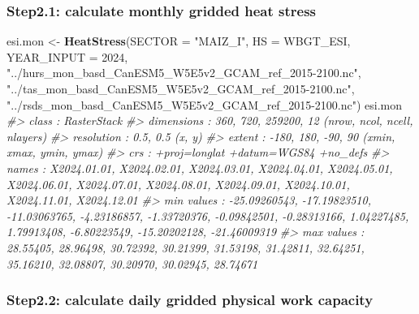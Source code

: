 \documentclass[
]{article}
\newenvironment{Shaded}{\begin{snugshade}}{\end{snugshade}}
\newcommand{\AttributeTok}[1]{\textcolor[rgb]{0.13,0.29,0.53}{#1}}
\newcommand{\CommentTok}[1]{\textcolor[rgb]{0.56,0.35,0.01}{\textit{#1}}}
\newcommand{\DecValTok}[1]{\textcolor[rgb]{0.00,0.00,0.81}{#1}}
\newcommand{\FunctionTok}[1]{\textcolor[rgb]{0.13,0.29,0.53}{\textbf{#1}}}
\newcommand{\NormalTok}[1]{#1}
\newcommand{\OtherTok}[1]{\textcolor[rgb]{0.56,0.35,0.01}{#1}}
\newcommand{\StringTok}[1]{\textcolor[rgb]{0.31,0.60,0.02}{#1}}
\begin{document}
\subsubsection{Step2.1: calculate monthly gridded heat
stress}\label{step2.1-calculate-monthly-gridded-heat-stress}

\begin{Shaded}
\begin{Highlighting}[]
\NormalTok{esi.mon }\OtherTok{\textless{}{-}} \FunctionTok{HeatStress}\NormalTok{(}\AttributeTok{SECTOR =} \StringTok{"MAIZ\_I"}\NormalTok{, }\AttributeTok{HS =}\NormalTok{ WBGT\_ESI, }\AttributeTok{YEAR\_INPUT =} \DecValTok{2024}\NormalTok{,}
                    \StringTok{"../hurs\_mon\_basd\_CanESM5\_W5E5v2\_GCAM\_ref\_2015{-}2100.nc"}\NormalTok{,}
                    \StringTok{"../tas\_mon\_basd\_CanESM5\_W5E5v2\_GCAM\_ref\_2015{-}2100.nc"}\NormalTok{,}
                    \StringTok{"../rsds\_mon\_basd\_CanESM5\_W5E5v2\_GCAM\_ref\_2015{-}2100.nc"}\NormalTok{)}
\NormalTok{esi.mon}
\CommentTok{\#\textgreater{} class      : RasterStack }
\CommentTok{\#\textgreater{} dimensions : 360, 720, 259200, 12  (nrow, ncol, ncell, nlayers)}
\CommentTok{\#\textgreater{} resolution : 0.5, 0.5  (x, y)}
\CommentTok{\#\textgreater{} extent     : {-}180, 180, {-}90, 90  (xmin, xmax, ymin, ymax)}
\CommentTok{\#\textgreater{} crs        : +proj=longlat +datum=WGS84 +no\_defs }
\CommentTok{\#\textgreater{} names      :  X2024.01.01,  X2024.02.01,  X2024.03.01,  X2024.04.01,  X2024.05.01,  X2024.06.01,  X2024.07.01,  X2024.08.01,  X2024.09.01,  X2024.10.01,  X2024.11.01,  X2024.12.01 }
\CommentTok{\#\textgreater{} min values : {-}25.09260543, {-}17.19823510, {-}11.03063765,  {-}4.23186857,  {-}1.33720376,  {-}0.09842501,  {-}0.28313166,   1.04227485,   1.79913408,  {-}6.80223549, {-}15.20202128, {-}21.46009319 }
\CommentTok{\#\textgreater{} max values :     28.55405,     28.96498,     30.72392,     30.21399,     31.53198,     31.42811,     32.64251,     35.16210,     32.08807,     30.20970,     30.02945,     28.74671}
\end{Highlighting}
\end{Shaded}

\subsubsection{Step2.2: calculate daily gridded physical work
capacity}\label{step2.2-calculate-daily-gridded-physical-work-capacity}
\end{document}
